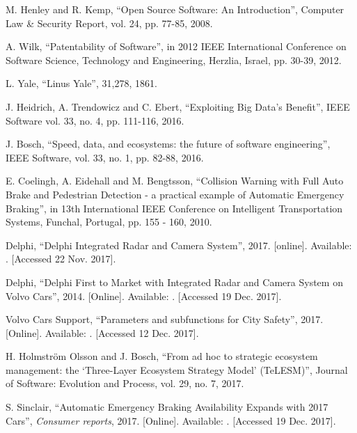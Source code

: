 \documentclass[conference]{IEEEtran}
\begin{document}
\begin{thebibliography}{00}
	M. Henley and R. Kemp,
	``Open Source Software: An Introduction'', 
	Computer Law \& Security Report,
	vol. 24, pp. 77-85, 
	2008.
	
	A. Wilk,
	``Patentability of Software'',
	in 2012 IEEE International Conference on Software Science, Technology and Engineering,
	Herzlia, Israel,
	pp. 30-39,
	2012.
	
	L. Yale,
	``Linus Yale'',
	31,278,
	1861.
	
	J. Heidrich, A. Trendowicz and C. Ebert,
	``Exploiting Big Data's Benefit'',
	IEEE Software 
	vol. 33, no. 4, pp. 111-116,
	2016.
	
	J. Bosch,
	``Speed, data, and ecosystems: the future of software engineering'',
	IEEE Software,
	vol. 33, no. 1, pp. 82-88, 
	2016.
	
	E. Coelingh, A. Eidehall and M. Bengtsson,
	``Collision Warning with Full Auto Brake and Pedestrian Detection - a practical example of Automatic Emergency Braking'',
	in 13th International IEEE Conference on Intelligent Transportation Systems, 
	Funchal, Portugal,
	pp. 155 - 160,
	2010.
	
	Delphi,
	``Delphi Integrated Radar and Camera System'',
	2017.
	[online]. Available: .
	[Accessed 22 Nov. 2017].
	
	Delphi,
	``Delphi First to Market with Integrated Radar and Camera System on Volvo Cars'',
	2014.
	[Online]. Available: .
	[Accessed 19 Dec. 2017].
	
	Volvo Cars Support,
	``Parameters and subfunctions for City Safety'',
	2017.
	[Online]. Available: 
	.
	[Accessed 12 Dec. 2017].
	
	H. Holmstr\"{o}m Olsson and J. Bosch,
	``From ad hoc to strategic ecosystem management: the `Three-Layer Ecosystem Strategy Model' (TeLESM)'',
	Journal of Software: Evolution and Process,
	vol. 29, no. 7, 
	2017.
	
	S. Sinclair,
	``Automatic Emergency Braking Availability Expands with 2017 Cars'',
	\emph{Consumer reports},
	2017.
	[Online]. Available:
	.
	[Accessed 19 Dec. 2017].
	

\end{thebibliography}
\end{document}
